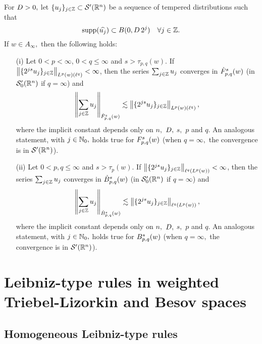 \begin{theorem}\label{thm:Nikolskij:weighted} For $\A> 0,$ let $\{u_j\}_{j \in \ent} \subset \mathcal{S}'(\rn)$ be a sequence of tempered distributions such that
\begin{equation*}
\supp(\widehat{u_j}) \subset B(0, \A\, 2^j ) \quad \forall j \in \ent.
\end{equation*}
If $w\in A_\infty,$ then the following holds:  
\begin{enumerate}
\item[(i)]\label{item:thh:Nikolskij:TL} Let $0 < p < \infty$, $0 < q \leq \infty$ and $s > \tau_{p,q}(w)$. If $\norm{\{2^{js} u_j\}_{j\in\ent}}{L^p(w)(\ell^{q})} < \infty$, then the series $\sum_{j \in \ent} u_j$ converges in $\tlw{p}{s}{q}{w}$ (in $\mathcal{S}'_0(\rn)$ if $q=\infty$) and 
\begin{equation*}
\norm{\sum_{j \in \ent} u_j}{\tlw{p}{s}{q}{w}} \lesssim  \norm{\{2^{js} u_j\}_{j\in\ent}}{L^p(w)(\ell^{q})},
\end{equation*}
where the implicit constant depends only on $n,$ $\A,$ $s,$ $p$ and  $q.$  An analogous statement, with $j\in\naz,$ holds true for $\itlw{p}{s}{q}{w}$ (when $q=\infty,$  the convergence is in $\swp$).
\item[(ii)]\label{item:thh:Nikolskij:B} Let $0 < p, q \leq \infty$ and $s > \tau_p(w)$. If $\norm{\{2^{js} u_j\}_{j\in\ent}}{\ell^{q}(L^p(w))} < \infty$, then the series $\sum_{j \in \ent} u_j$ converges in  $\besw{p}{s}{q}{w}$ (in $\mathcal{S}'_0(\rn)$ if $q=\infty$) and 
\begin{equation*}
\norm{\sum_{j \in \ent} u_j}{\besw{p}{s}{q}{w}} \lesssim  \norm{\{2^{js} u_j\}_{j\in\ent}}{\ell^{q}(L^p(w))},
\end{equation*}
where the implicit constant depends only on $n,$ $\A,$ $s,$ $p$ and $q.$   An analogous statement, with $j\in\naz,$ holds true for $\ibesw{p}{s}{q}{w}$ (when $q=\infty,$  the convergence is in $\swp$).
\end{enumerate}
\end{theorem} 
 
 
 
 \section{Leibniz-type rules in weighted Triebel-Lizorkin and Besov spaces}
 
 \subsection{Homogeneous Leibniz-type rules}
 
